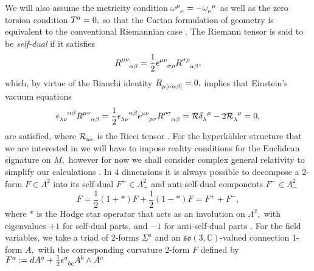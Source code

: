 \documentclass[a4paper,12pt, onecolumn, notitlepage]{article}
\theoremstyle{definition}
\theoremstyle{remark}
\newcommand{\al}{\alpha}
\newcommand{\w}{\omega}
\newcommand{\m}{\mu}
\newcommand{\n}{\nu}
\newcommand{\e}{\epsilon}
\newcommand{\HK}{hyperk\"ahler }
\begin{document}
We will also assume the metricity condition $\w\indices{^\m_\n}=-\w\indices{_\n^\m}$ as well as the zero torsion condition $T\indices{^a}=0,$ so that the Cartan formulation of geometry is equivalent to the conventional Riemannian case \cite{eguchi_1980}. The Riemann tensor is said to be \emph{self-dual} if it satisfies
\begin{equation*}
	R\indices{^\m^\n_\al_\beta} = \frac{1}{2}\e\indices{^\m^\n_\sigma_\rho}R\indices{^\sigma^\rho_\al_\beta},
\end{equation*}
which, by virtue of the Bianchi identity $R\indices{_\m_{[\n\al\beta]}}=0,$ implies that Einstein's vacuum equations
\begin{equation*}
	\e\indices{_{\lambda\n}^{\al\beta}}R\indices{^{\m\n}_{\al\beta}}=\frac{1}{2}\e\indices{_{\lambda\n}^{\al\beta}}\e\indices{^{\m\n}_{\rho\sigma}}R\indices{^{\rho\sigma}_{\al\beta}}= \mathcal{R}\delta\indices{_{\lambda}^\m}-2\mathcal{R}\indices{_\lambda^\m}=0,
\end{equation*}
are satisfied, where $\mathcal{R}\indices{_{ae}}$ is the Ricci tensor \cite{eguchi_1980}.
For the \HK structure that we are interested in we will have to impose reality conditions for the Euclidean signature on $M,$ however for now we shall consider complex general relativity to simplify our calculations \cite{capovilla_1993}. In 4 dimensions it is always possible to decompose a 2-form $F\in\Lambda^{2}$ into its self-dual $F^{+}\in\Lambda^{2}_{+}$ and anti-self-dual components $F^{-}\in\Lambda^{2}_{-}$
\begin{equation*}
	F = \frac{1}{2}(1+\ast)F + \frac{1}{2}(1-\ast)F = F^{+} + F^{-},
\end{equation*}
where $\ast$ is the Hodge star operator that acts as an involution on $\Lambda^{2},$ with eigenvalues $+1$ for self-dual parts, and $-1$ for anti-self-dual parts \cite{}.
For the field variables, we take a triad of 2-forms $\Sigma^{a}$ and an $\mathfrak{so}(3,\mathbb{C})$-valued connection 1-form $A,$ with the corresponding curvature 2-form $F$ defined by $F\indices{^a}:=dA\indices{^a}+\frac{1}{2}\e\indices{^a_b_c}A\indices{^b}\wedge A\indices{^c}$ \cite{capovilla_1989}\\
\end{document}

